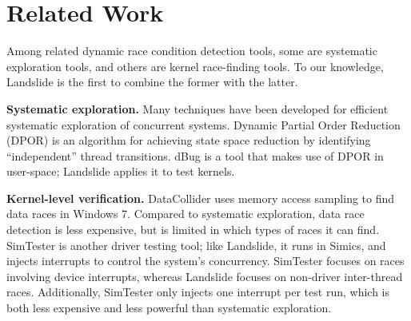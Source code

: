 \documentclass{llncs}
\begin{document}
\section{Related Work}

Among related dynamic race condition detection tools, some are systematic exploration tools, and others are kernel race-finding tools. To our knowledge, Landslide is the first to combine the former with the latter.

{\bf Systematic exploration.} Many techniques have been developed for efficient systematic exploration of concurrent systems. Dynamic Partial Order Reduction (DPOR) \cite{dpor,dbug-retreat} is an algorithm for achieving state space reduction by identifying ``independent'' thread transitions. dBug \cite{dbug-ssv} is a tool that makes use of DPOR in user-space; Landslide applies it to test kernels.


{\bf Kernel-level verification.}
DataCollider \cite{datacollider} uses memory access sampling to find data races in Windows 7. Compared to systematic exploration, data race detection is less expensive, but is limited in which types of races it can find.
SimTester \cite{simtester} is another driver testing tool; like Landslide, it runs in Simics, and injects interrupts to control the system's concurrency. SimTester focuses on races involving device interrupts, whereas Landslide focuses on non-driver inter-thread races. Additionally, SimTester only injects one interrupt per test run, which is both less expensive and less powerful than systematic exploration.

\end{document}
